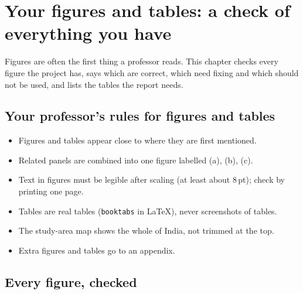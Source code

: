 \chapter{Your figures and tables: a check of everything you have}
\label{ch:figures}

Figures are often the first thing a professor reads. This chapter checks every figure the project has, says which are correct, which need fixing and which should not be used, and lists the tables the report needs.

\section{Your professor's rules for figures and tables}

\begin{itemize}
  \item Figures and tables appear close to where they are first mentioned.
  \item Related panels are combined into one figure labelled (a), (b), (c).
  \item Text in figures must be legible after scaling (at least about 8\,pt); check by printing one page.
  \item Tables are real tables (\texttt{booktabs} in LaTeX), never screenshots of tables.
  \item The study-area map shows the whole of India, not trimmed at the top.
  \item Extra figures and tables go to an appendix.
\end{itemize}

\section{Every figure, checked}

